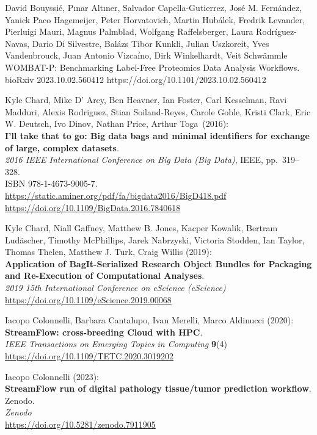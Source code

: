 \documentclass[10pt,letterpaper]{article}
\begin{document}
\begin{thebibliography}{10}
\begin{small}
 David Bouyssié, Pınar Altıner, Salvador Capella-Gutierrez, José M. Fernández, Yanick Paco Hagemeijer, Peter Horvatovich, Martin Hubálek, Fredrik Levander, Pierluigi Mauri, Magnus Palmblad, Wolfgang Raffelsberger, Laura Rodríguez-Navas, Dario Di Silvestre, Balázs Tibor Kunkli, Julian Uszkoreit, Yves Vandenbrouck, Juan Antonio Vizcaíno, Dirk Winkelhardt, Veit Schwämmle
WOMBAT-P: Benchmarking Label-Free Proteomics Data Analysis Workflows.
bioRxiv 2023.10.02.560412
https://doi.org/10.1101/2023.10.02.560412

Kyle Chard, Mike D' Arcy, Ben Heavner, Ian Foster, Carl
Kesselman, Ravi Madduri, Alexis Rodriguez, Stian Soiland-Reyes, Carole
Goble, Kristi Clark, Eric W. Deutsch, Ivo Dinov, Nathan Price, Arthur
Toga~(2016):\\
\textbf{I'll take that to go: Big data bags and minimal identifiers for
exchange of large, complex datasets}.\\
\emph{2016 IEEE International Conference on Big Data (Big Data)}, IEEE,
pp.~319--328.\\
ISBN 978-1-4673-9005-7.\\
\url{https://static.aminer.org/pdf/fa/bigdata2016/BigD418.pdf}\\
\url{https://doi.org/10.1109/BigData.2016.7840618}

Kyle Chard, Niall Gaffney, Matthew B. Jones, Kacper
Kowalik, Bertram Ludäscher, Timothy McPhillips, Jarek Nabrzyski,
Victoria Stodden, Ian Taylor, Thomas Thelen, Matthew J. Turk, Craig
Willis (2019):\\
\textbf{Application of BagIt-Serialized Research Object Bundles for Packaging and Re-Execution of Computational Analyses}.\\
\emph{2019 15th International Conference on eScience (eScience)}\\
\url{https://doi.org/10.1109/eScience.2019.00068}

Iacopo Colonnelli, Barbara Cantalupo, Ivan Merelli, Marco Aldinucci (2020):\\
\textbf{StreamFlow: cross-breeding Cloud with HPC}.\\
\emph{IEEE Transactions on Emerging Topics in Computing} \textbf{9}(4)\\
\url{https://doi.org/10.1109/TETC.2020.3019202}

Iacopo Colonnelli (2023):\\
\textbf{StreamFlow run of digital pathology tissue/tumor prediction workflow}.\\
Zenodo.\\
\emph{Zenodo}\\
\url{https://doi.org/10.5281/zenodo.7911905}


\end{small}
\end{thebibliography}
\end{document}
